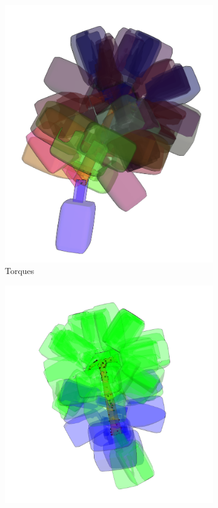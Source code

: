\documentclass[12pt]{ucsddissertation}
\begin{document}
\begin{figure}
	\centering
	\begin{subfigure}[b]{0.4\linewidth}
		\includegraphics[width=\linewidth]{figures/torques.png}
		\caption{Torques}\label{classificationfiga}
	\end{subfigure}%
	\hfill
	\begin{subfigure}[b]{0.4165\linewidth}
		\includegraphics[width=\linewidth]{figures/classified.png}

\end{subfigure}
\end{figure}
\end{document}
